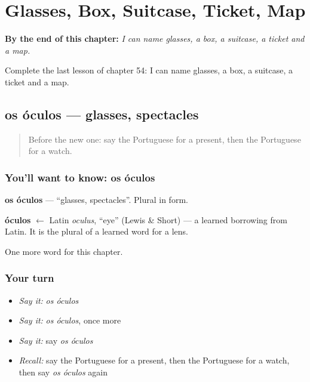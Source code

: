 
\chapter{Glasses, Box, Suitcase, Ticket, Map}
\label{ch:pt-glasses-box-suitcase-ticket-map}

\begin{chapteropening}
\textbf{By the end of this chapter:} \emph{I can name glasses, a box, a suitcase, a ticket and a map.}

Complete the last lesson of chapter 54: I can name glasses, a box, a suitcase, a ticket and a map.
\end{chapteropening}

\section[os óculos]{os óculos — glasses, spectacles}

\label{lesson:PT-C54-oculos}



\begin{quote}
Before the new one: say the Portuguese for a present, then the Portuguese for a watch.
\end{quote}

\subsection*{You'll want to know: os óculos}
\textbf{os óculos} — \textquotedblleft{}glasses, spectacles\textquotedblright{}. Plural in form.

\begin{cousinweb}
\textbf{óculos} $\leftarrow$ Latin \emph{oculus}, \textquotedblleft{}eye\textquotedblright{} (Lewis \& Short) — a learned borrowing from Latin. It is the plural of a learned word for a lens.
\end{cousinweb}

\begin{grammarlens}[title={What you've built}]
One more word for this chapter.
\end{grammarlens}

\subsection*{Your turn}
\begin{itemize}
\raggedright
  \item \emph{Say it:} \emph{os óculos}
  \item \emph{Say it:} \emph{os óculos}, once more
  \item \emph{Say it:} say \emph{os óculos}
  \item \emph{Recall:} say the Portuguese for a present, then the Portuguese for a watch, then say \emph{os óculos} again
\end{itemize}

